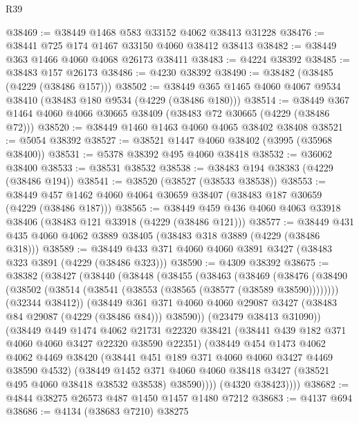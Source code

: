 \begin{lexlean}{R39}
\begin{coremodule}
@38469 := @38449 @1468 @583 @33152 @4062 @38413 @31228
@38476 := @38441 @725 @174 @1467 @33150 @4060 @38412 @38413
@38482 := @38449 @363 @1466 @4060 @4068 @26173 @38411
@38483 := @4224 @38392
@38485 := @38483 @157 @26173
@38486 := @4230 @38392
@38490 := @38482 (@38485 (@4229 (@38486 @157)))
@38502 := @38449 @365 @1465 @4060 @4067 @9534 @38410 (@38483 @180 @9534 (@4229 (@38486 @180)))
@38514 := @38449 @367 @1464 @4060 @4066 @30665 @38409 (@38483 @72 @30665 (@4229 (@38486 @72)))
@38520 := @38449 @1460 @1463 @4060 @4065 @38402 @38408
@38521 := @5054 @38392
@38527 := @38521 @1447 @4060 @38402 (@3995 (@35968 @38400))
@38531 := @5378 @38392 @495 @4060 @38418
@38532 := @36062 @38400
@38533 := @38531 @38532
@38538 := @38483 @194 @38383 (@4229 (@38486 @194))
@38541 := @38520 (@38527 (@38533 @38538))
@38553 := @38449 @457 @1462 @4060 @4064 @30659 @38407 (@38483 @187 @30659 (@4229 (@38486 @187)))
@38565 := @38449 @459 @436 @4060 @4063 @33918 @38406 (@38483 @121 @33918 (@4229 (@38486 @121)))
@38577 := @38449 @431 @435 @4060 @4062 @3889 @38405 (@38483 @318 @3889 (@4229 (@38486 @318)))
@38589 := @38449 @433 @371 @4060 @4060 @3891 @3427 (@38483 @323 @3891 (@4229 (@38486 @323)))
@38590 := @4309 @38392
@38675 := @38382
    (@38427
      (@38440
        (@38448
          (@38455
            (@38463
              (@38469
                (@38476
                  (@38490 (@38502 (@38514 (@38541 (@38553 (@38565 (@38577 (@38589 @38590))))))))
                  (@32344 @38412))
                (@38449
                  @361
                  @371
                  @4060
                  @4060
                  @29087
                  @3427
                  (@38483 @84 @29087 (@4229 (@38486 @84)))
                  @38590))
              (@23479 @38413 @31090))
            (@38449
              @449
              @1474
              @4062
              @21731
              @22320
              @38421
              (@38441 @439 @182 @371 @4060 @4060 @3427 @22320 @38590 @22351)
              (@38449
                @454
                @1473
                @4062
                @4062
                @4469
                @38420
                (@38441 @451 @189 @371 @4060 @4060 @3427 @4469 @38590 @4532)
                (@38449
                  @1452
                  @371
                  @4060
                  @4060
                  @38418
                  @3427
                  (@38521 @495 @4060 @38418 @38532 @38538)
                  @38590))))
          (@4320 @38423))))
@38682 := @4844 @38275 @26573 @487 @1450 @1457 @1480 @7212
@38683 := @4137 @694
@38686 := @4134 (@38683 @7210) @38275

\end{coremodule}
\end{lexlean}
